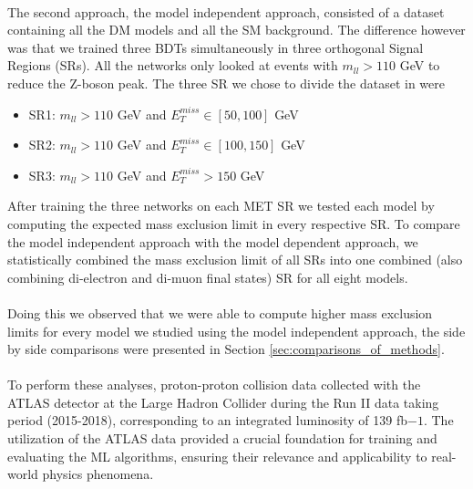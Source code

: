 \documentclass[12pt, a4paper]{book}
\begin{document}
\\The second approach, the model independent approach, consisted of a dataset containing all the DM models and all the SM background. The difference however was that we trained three BDTs simultaneously in three orthogonal Signal Regions (SRs). 
All the networks only looked at events with $m_{ll}>110$ GeV to reduce the Z-boson peak. 
The three SR we chose to divide the dataset in were 
\begin{itemize}
   \item SR1: $m_{ll} >110$ GeV and $E_T^{miss} \in [50, 100]$ GeV
   \item SR2: $m_{ll} >110$ GeV and $E_T^{miss} \in [100, 150]$ GeV
   \item SR3: $m_{ll} >110$ GeV and $E_T^{miss} >150$ GeV
\end{itemize} 
After training the three networks on each MET SR we tested each model by computing the expected mass exclusion limit in every respective SR. To compare the model independent approach with the model dependent approach, 
we statistically combined the mass exclusion limit of all SRs into one combined (also combining di-electron and di-muon final states) SR for all eight models. \\
\\Doing this we observed that we were able to compute higher mass exclusion limits for every model we studied using the model independent approach, the side by side comparisons were presented in Section \ref{sec:comparisons_of_methods}.\\
\\To perform these analyses, proton-proton collision data collected with the ATLAS detector at the Large Hadron Collider during the Run II data taking period (2015-2018), corresponding to an integrated luminosity of 139 fb${-1}$. The utilization of the ATLAS data provided a crucial foundation for training and evaluating the ML algorithms, 
ensuring their relevance and applicability to real-world physics phenomena.
\end{document}
